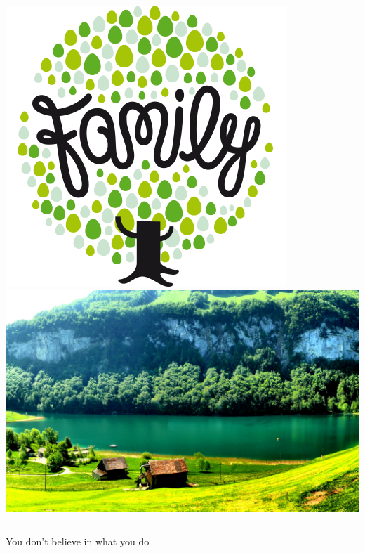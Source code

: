 \documentclass[]{beamer}
\begin{document}
\begin{frame}
\centering
\begin{columns}
\centering
\includegraphics[width=\textwidth]{family}
\centering
\includegraphics[width=\textwidth]{beautiful-place}

\end{columns}
\end{frame}

\begin{frame}
\centering
You don't believe in what you do
\end{frame}
\end{document}
